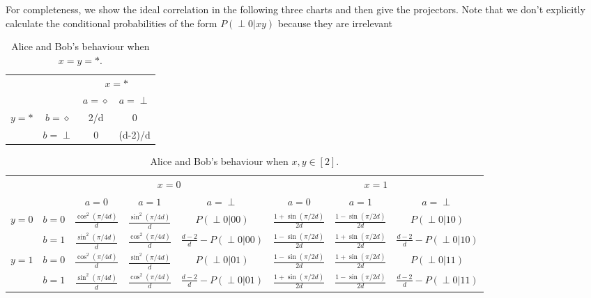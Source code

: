 \documentclass[11pt,letterpaper]{article}
\newcommand{\1}{\mathbb{1}}
\newcommand{\pr}[2]{P(#1|#2)}
\theoremstyle{definition}
\begin{document}
For completeness, we show the ideal correlation in the following three charts and then give the projectors. 
Note that we don't explicitly calculate the conditional probabilities of the form $\pr{\perp 0}{xy}$ because they are irrelevant
\begin{table}[H]
\begin{center}
\begin{tabular}{|c|c||c|c|}
\hline
\multicolumn{2}{|c|}{} &
\multicolumn{2}{|c|}{$x=\ast$}\\
\cline{3-4}
\multicolumn{2}{|c|}{} &$a = \diamond$ & $a = \perp$ \\
\hline
\hline
\multirow{2}{*}{$y = \ast$} & $b=\diamond$ & 2/d & 0 \\
\cline{2-4}
&$b=\perp$ & 0 & (d-2)/d \\
\hline
\end{tabular}
\caption{Alice and Bob's behaviour when $x=y=\ast$.}
\end{center}
\end{table}

\begin{table}[H]
\begin{center}
\begin{tabular}{|c|c||c|c|c|c|c|c|}
\hline
\multicolumn{2}{|c|}{} &
\multicolumn{3}{|c|}{$x=0$}&
\multicolumn{3}{|c|}{$x=1$} \\
\cline{3-8}
\multicolumn{2}{|c|}{} &
$a = 0$ & $a=1$ & $a=\perp$ &
$a = 0$ & $a=1$ & $a=\perp$\\
\hline
\hline
\multirow{2}{*}{$y = 0$} & $b=0$ & $\frac{\cos^2(\pi/4d)}{d}$ & $\frac{\sin^2(\pi/4d)}{d}$ & \small $\pr{\perp0}{00}$ 
& $\frac{1+\sin(\pi/2d)}{2d}$ & $\frac{1-\sin(\pi/2d)}{2d}$ & \small  $\pr{\perp0}{10}$ \\
\cline{2-8}
&$b=1$ & $\frac{\sin^2(\pi/4d)}{d}$ & $\frac{\cos^2(\pi/4d)}{d}$ & $\frac{d-2}{d}-\pr{\perp0}{00}$ 
&  $\frac{1-\sin(\pi/2d)}{2d}$ & $\frac{1+\sin(\pi/2d)}{2d}$ & \small $\frac{d-2}{d} - \pr{\perp0}{10}$  \\
\hline
\multirow{2}{*}{$y = 1$} & $b=0$ & $\frac{\cos^2(\pi/4d)}{d}$ & $\frac{\sin^2(\pi/4d)}{d}$ & \small $\pr{\perp0}{01}$ & 
$ \frac{1-\sin(\pi/2d)}{2d}$ & $ \frac{1+\sin(\pi/2d)}{2d}$ & \small $\pr{\perp 0}{11}$  \\
\cline{2-8}
&$b=1$ & $\frac{\sin^2(\pi/4d)}{d}$ & $\frac{\cos^2(\pi/4d)}{d}$ & \small $\frac{d-2}{d}-\pr{\perp0}{01}$ &  
$ \frac{1+\sin(\pi/2d)}{2d}$ & $ \frac{1-\sin(\pi/2d)}{2d}$ & \small $\frac{d-2}{d}- \pr{\perp 0}{11}$ \\
\hline
\end{tabular}
\end{center}
\caption{Alice and Bob's behaviour when $x,y \in [2]$.}
\end{table}
\end{document}
